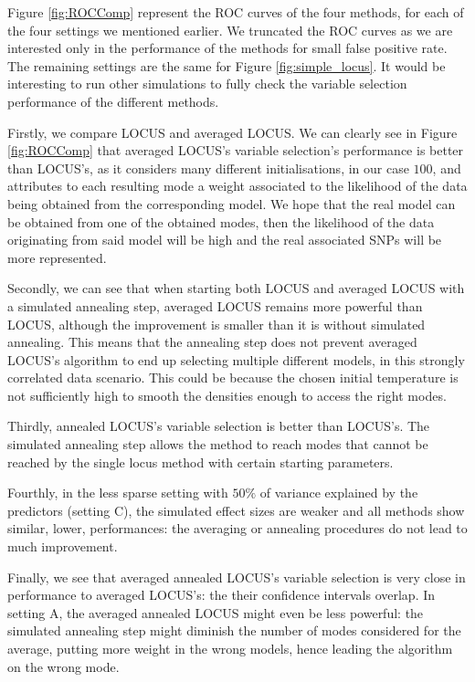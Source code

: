 \documentclass[a4paper, 11pt]{report}
\numberwithin{equation}{chapter}
\begin{document}
Figure \ref{fig:ROCComp} represent the ROC curves of the four methods, for each of the four settings we mentioned earlier. We truncated the ROC curves as we are interested only in the performance of the methods for small false positive rate. The remaining settings are the same for Figure \ref{fig:simple_locus}. It would be interesting to run other simulations to fully check the variable selection performance of the different methods.

Firstly, we compare LOCUS and averaged LOCUS. We can clearly see in Figure \ref{fig:ROCComp} that averaged LOCUS's variable selection's performance is better than LOCUS's, as it considers many different initialisations, in our case $100$, and attributes to each resulting mode a weight associated to the likelihood of the data being obtained from the corresponding model. We hope that the real model can be obtained from one of the obtained modes, then the likelihood of the data originating from said model will be high and the real associated SNPs will be more represented.

Secondly, we can see that when starting both LOCUS and averaged LOCUS with a simulated annealing step, averaged LOCUS remains more powerful than LOCUS, although the improvement is smaller than it is without simulated annealing. This means that the annealing step does not prevent averaged LOCUS's algorithm to end up selecting multiple different models, in this strongly correlated data scenario. This could be because the chosen initial temperature is not sufficiently high to smooth the densities enough to access the right modes.

Thirdly, annealed LOCUS's variable selection is better than LOCUS's. The simulated annealing step allows the method to reach modes that cannot be reached by the single locus method with certain starting parameters. 

Fourthly, in the less sparse setting with $50\%$ of variance explained by the predictors (setting C), the simulated effect sizes are weaker and all methods show similar, lower, performances: the averaging or annealing procedures do not lead to much improvement.

Finally, we see that averaged annealed LOCUS's variable selection is very close in performance to averaged LOCUS's: the their confidence intervals overlap. In setting A, the averaged annealed LOCUS might even be less powerful: the simulated annealing step might diminish the number of modes considered for the average, putting more weight in the wrong models, hence leading the algorithm on the wrong mode.
\end{document}
